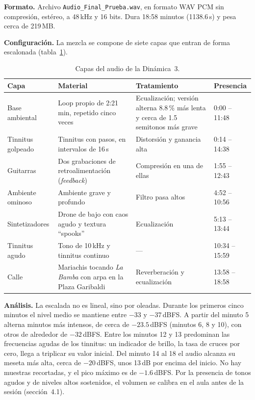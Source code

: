 \textbf{Formato.} Archivo \texttt{Audio\_Final\_Prueba.wav}, en formato WAV PCM sin compresión, estéreo, a 48\,kHz y 16 bits. Dura 18:58 minutos (1138.6\,s) y pesa cerca de 219\,MB.

\textbf{Configuración.} La mezcla se compone de siete capas que entran de forma escalonada (tabla~\ref{tab:capas}).

\begin{table}[htbp]
\centering
\small
\caption{Capas del audio de la Dinámica~3.}
\label{tab:capas}
\begin{tabularx}{\textwidth}{@{}l X X l@{}}
\toprule
\textbf{Capa} & \textbf{Material} & \textbf{Tratamiento} & \textbf{Presencia} \\
\midrule
Base ambiental & Loop propio de 2:21 min, repetido cinco veces & Ecualización; versión alterna 8.8\,\% más lenta y cerca de 1.5 semitonos más grave & 0:00 -- 11:48 \\
Tinnitus golpeado & Tinnitus con pasos, en intervalos de 16\,s & Distorsión y ganancia alta & 0:14 -- 14:38 \\
Guitarras & Dos grabaciones de retroalimentación (\textit{feedback}) & Compresión en una de ellas & 1:55 -- 12:43 \\
Ambiente ominoso & Ambiente grave y profundo & Filtro pasa altos & 4:52 -- 10:56 \\
Sintetizadores & Drone de bajo con caos agudo y textura \enquote{spooks} & Ecualización & 5:13 -- 13:44 \\
Tinnitus agudo & Tono de 10\,kHz y tinnitus continuo & --- & 10:34 -- 15:59 \\
Calle & Mariachis tocando \textit{La Bamba} con arpa en la Plaza Garibaldi & Reverberación y ecualización & 13:58 -- 18:58 \\
\bottomrule
\end{tabularx}
\end{table}

\textbf{Análisis.} La escalada no es lineal, sino por oleadas. Durante los primeros cinco minutos el nivel medio se mantiene entre $-33$ y $-37$\,dBFS. A partir del minuto 5 alterna minutos más intensos, de cerca de $-23.5$\,dBFS (minutos 6, 8 y 10), con otros de alrededor de $-32$\,dBFS. Entre los minutos 12 y 13 predominan las frecuencias agudas de los tinnitus: un indicador de brillo, la tasa de cruces por cero, llega a triplicar su valor inicial. Del minuto 14 al 18 el audio alcanza su meseta más alta, cerca de $-20$\,dBFS, unos 13\,dB por encima del inicio. No hay muestras recortadas, y el pico máximo es de $-1.6$\,dBFS. Por la presencia de tonos agudos y de niveles altos sostenidos, el volumen se calibra en el aula antes de la sesión (sección~4.1).


